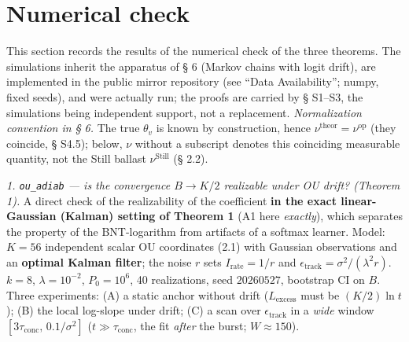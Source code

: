\documentclass[12pt]{iopart}
\begin{document}
\section{Numerical check}\label{numerical-check}



This section records the results of the numerical check of the three theorems. The simulations inherit the apparatus of § 6 \cite{Andriishin2026b} (Markov chains with logit drift), are implemented in the public mirror repository (see ``Data Availability''; numpy, fixed seeds), and were actually run; the proofs are carried by § S1--S3, the simulations being independent support, not a replacement. \emph{Normalization convention in § 6.} The true \(\theta_v\) is known by construction, hence \(\nu^{\text{theor}} = \nu^{\text{op}}\) (they coincide, § S4.5); below, \(\nu\) without a subscript denotes this coinciding measurable quantity, not the Still ballast \(\nu^{\text{Still}}\) (§ 2.2).



\emph{1. \texttt{ou\_adiab} --- is the convergence \(B \to K/2\) realizable under OU drift? (Theorem 1).} A direct check of the realizability of the coefficient \textbf{in the exact linear-Gaussian (Kalman) setting of Theorem 1} (A1 here \emph{exactly}), which separates the property of the BNT-logarithm from artifacts of a softmax learner. Model: \(K = 56\) independent scalar OU coordinates (2.1) with Gaussian observations and an \textbf{optimal Kalman filter}; the noise \(r\) sets \(I_{\text{rate}} = 1/r\) and \(\epsilon_{\text{track}} = \sigma^2/(\lambda^2 r)\). \(k = 8\), \(\lambda = 10^{-2}\), \(P_0 = 10^6\), 40 realizations, seed \(20260527\), bootstrap CI on \(B\). Three experiments: (A) a static anchor without drift (\(L_{\text{excess}}\) must be \((K/2)\ln t\)); (B) the local log-slope under drift; (C) a scan over \(\epsilon_{\text{track}}\) in a \emph{wide} window \([3\tau_{\text{conc}},\,0.1/\sigma^2]\) (\(t \gg \tau_{\text{conc}}\), the fit \emph{after} the burst; \(W \approx 150\)).
\end{document}
